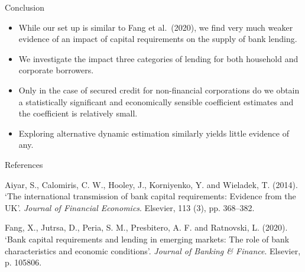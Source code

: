 \documentclass[
  14,
  ignorenonframetext,
  aspectratio=141,
]{beamer}
\providecommand{\tightlist}{%
  \setlength{\itemsep}{0pt}\setlength{\parskip}{0pt}}
\newlength{\cslhangindent}
\newlength{\cslentryspacingunit} %
\newenvironment{CSLReferences}[2] %
 {%
  \setlength{\parindent}{0pt}
  \ifodd #1
  \let\oldpar\par
  \def\par{\hangindent=\cslhangindent\oldpar}
  \fi
  \setlength{\parskip}{#2\cslentryspacingunit}
 }%
 {}
\begin{document}
\begin{frame}{Conclusion}
\protect\hypertarget{conclusion}{}
\begin{itemize}
\tightlist
\item
  While our set up is similar to Fang et al.~(2020), we find very much
  weaker evidence of an impact of capital requirements on the supply of
  bank lending.
\item
  We investigate the impact three categories of lending for both
  household and corporate borrowers.
\item
  Only in the case of secured credit for non-financial corporations do
  we obtain a statistically significant and economically sensible
  coefficient estimates and the coefficient is relatively small.
\item
  Exploring alternative dynamic estimation similarly yields little
  evidence of any.
\end{itemize}
\end{frame}

\begin{frame}{References}
\protect\hypertarget{references}{}
\hypertarget{refs}{}
\begin{CSLReferences}{0}{0}
\leavevmode{}%
Aiyar, S., Calomiris, C. W., Hooley, J., Korniyenko, Y. and Wieladek, T.
(2014). {`The international transmission of bank capital requirements:
Evidence from the UK'}. \emph{Journal of Financial Economics}. Elsevier,
113 (3), pp. 368--382.

\leavevmode{}%
Fang, X., Jutrsa, D., Peria, S. M., Presbitero, A. F. and Ratnovski, L.
(2020). {`Bank capital requirements and lending in emerging markets: The
role of bank characteristics and economic conditions'}. \emph{Journal of
Banking \& Finance}. Elsevier, p. 105806.

\end{CSLReferences}
\end{frame}
\end{document}

